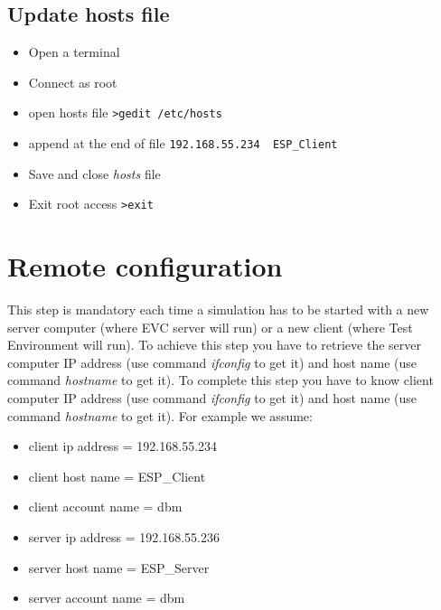 \subsection{Update hosts file}
\begin{itemize}
\item Open a terminal
\item Connect as root
\item open hosts file
	\newline
	\verb|>gedit /etc/hosts |
\item append at the end of file
	\newline
	\verb|192.168.55.234  ESP_Client|
\item Save and close \emph{hosts} file
\item Exit root access
	\newline
	\verb|>exit |
\end{itemize}

\section{Remote configuration}
This step is mandatory each time a simulation has to be started with a new server computer (where EVC server will run) or a new client (where Test Environment will run).
\newline
To achieve this step you have to retrieve the server computer IP address (use command \emph{ifconfig} to get it) and host name (use command \emph{hostname} to get it).
\newline
To complete this step you have to know client computer IP address (use command \emph{ifconfig} to get it) and host name (use command \emph{hostname} to get it).
\newline
For example we assume:
\begin{itemize}
\item client ip address = 192.168.55.234
\item client host name = ESP\_Client
\item client account name = dbm
\item server ip address = 192.168.55.236
\item server host name = ESP\_Server
\item server account name = dbm
\end{itemize}
